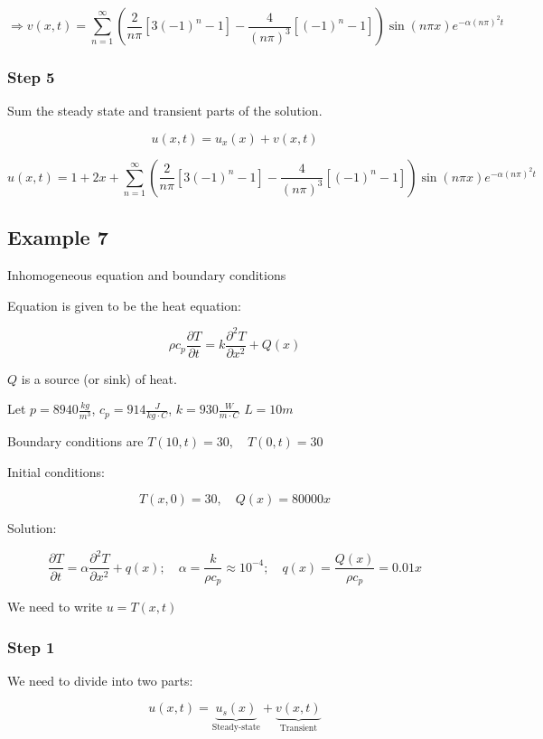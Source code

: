 \documentclass{article}
\begin{document}
$$\Rightarrow v(x,t) = \sum_{n = 1}^\infty \left( \frac{2}{n \pi} \left[ 3(-1)^n - 1 \right] - \frac{4}{(n \pi)^3} \left[(-1)^n - 1 \right] \right) \sin(n \pi x) e^{-\alpha (n \pi)^2 t}$$

\subsubsection{Step 5}

Sum the steady state and transient parts of the solution. 

$$u(x,t) = u_x (x) + v(x,t)$$

$$u(x,t) = 1 + 2x + \sum_{n = 1}^\infty \left( \frac{2}{n \pi} \left[ 3(-1)^n - 1 \right] - \frac{4}{(n \pi)^3} \left[(-1)^n - 1 \right] \right) \sin(n \pi x) e^{-\alpha (n \pi)^2 t}$$

\subsection{Example 7}

Inhomogeneous equation and boundary conditions

Equation is given to be the heat equation:

$$\rho c_p \frac{\partial T}{\partial t} = k \frac{\partial^2 T}{\partial x^2} + Q(x)$$

$Q$ is a source (or sink) of heat. 

Let $p = 8940 \frac{kg}{m^3}$, $c_p = 914 \frac{J}{kg \cdot C}$, $k = 930 \frac{W}{m \cdot C}$ $L = 10 m$

Boundary conditions are $T(10,t) = 30, \quad T(0,t) = 30$

Initial conditions:

$$T(x,0) = 30, \quad Q(x) = 80000 x$$

Solution:

$$\frac{\partial T}{\partial t} = \alpha \frac{\partial^2 T}{\partial x^2} + q(x); \quad \alpha = \frac{k}{\rho c_p} \approx 10^{-4}; \quad q(x) = \frac{Q(x)}{\rho c_p} = 0.01 x$$

We need to write $u = T(x,t)$

\subsubsection{Step 1}

We need to divide into two parts: 

$$u(x,t) = \underbrace{u_s (x)}_{\text{Steady-state}} + \underbrace{v(x,t)}_{\text{Transient}}$$
\end{document}
